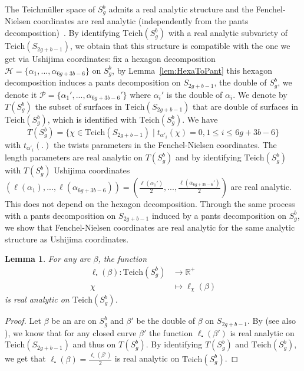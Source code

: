 \documentclass[a4paper,12pt]{article}
\newtheorem{lemme}[theorem]{Lemma}
\theoremstyle{definition}
\theoremstyle{remark}
\begin{document}
The Teichmüller space of $S_g^b$ admits a real analytic structure and the Fenchel-Nielsen coordinates are real analytic (independently from the pants decomposition)~\cite{TeichBord}. By identifying $\mathrm{Teich}(S_g^b)$ with a real analytic subvariety of $\mathrm{Teich}(S_{2g+b-1})$, we obtain that this structure is compatible with the one we get via Ushijima coordinates: fix a hexagon decomposition $\mathcal{H}=\{ \alpha_1,...,\alpha_{6g+3b-6} \}$ on $S_g^b$, by Lemma~\ref{lem:HexaToPant} this hexagon decomposition induces a pants decomposition on $S_{2g+b-1}$, the double of $S_g^b$, we denote it $\mathcal{P}=\{ \alpha_1',...,\alpha_{6g+3b-6}' \}$ where $\alpha_i'$ is the double of $\alpha_i$. We denote by $T(S_g^b)$ the subset of surfaces in $\mathrm{Teich}(S_{2g+b-1})$ that are double of surfaces in $\mathrm{Teich}(S_g^b)$, which is identified with $\mathrm{Teich}(S_g^b)$. We have 
    \[
        T(S_g^b)=\{ \chi \in \mathrm{Teich}(S_{2g+b-1}) \mid t_{\alpha'_i}(\chi)=0, 1 \leqslant i \leqslant 6g+3b-6 \}
    \]
with $t_{\alpha'_i}(.)$ the twists parameters in the Fenchel-Nielsen coordinates. The length parameters are real analytic on $T(S_g^b)$ and by identifying $\mathrm{Teich}(S_g^b)$ with $T(S_g^b)$ Ushijima coordinates $(\ell(\alpha_1),...,\ell(\alpha_{6g+3b-6}))=(\frac{\ell(\alpha_1')}{2},...,\frac{\ell(\alpha_{6g+3b-6}')}{2})$ are real analytic. This does not depend on the hexagon decomposition. Through the same process with a pants decomposition on $S_{2g+b-1}$ induced by a pants decomposition on $S_g^b$, we show that Fenchel-Nielsen coordinates are real analytic for the same analytic structure as Ushijima coordinates.

\begin{lemme}\label{lem:RealAnalLength}
    For any arc $\beta$, the function 
    \begin{align*}
        \ell_{\centerdot} (\beta) : \mathrm{Teich}(S_g^b) & \to \mathbb{R}^+ \\
        \chi & \mapsto \ell_{\chi}(\beta)
    \end{align*}
     is real analytic on $\mathrm{Teich}(S_g^b)$.
\end{lemme}

\begin{proof}
    Let $\beta$ be an arc on $S_g^b$ and $\beta'$ be the double of $\beta$ on $S_{2g+b-1}$. By \cite[Lemma~10.2.3]{buser} (see also \cite[Proposition~2.4]{McShaneParlier}), we know that for any closed curve $\beta'$ the function $\ell_{\centerdot}(\beta')$ is real analytic on $\mathrm{Teich}(S_{2g+b-1})$ and thus on $T(S_g^b)$. By identifying $T(S_g^b)$ and $\mathrm{Teich}(S_g^b)$, we get that $\ell_{\centerdot} (\beta)=\frac{\ell_{\centerdot} (\beta')}{2} $ is real analytic on $\mathrm{Teich}(S_g^b)$.
\end{proof}
\end{document}
